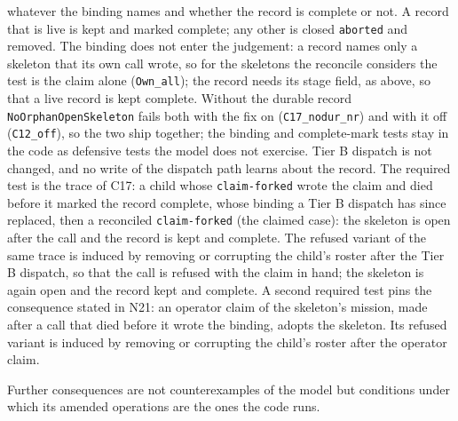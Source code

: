 \documentclass[a4paper,10pt,fleqn]{article}
\newcommand{\field}[1]{\texttt{#1}}
\begin{document}
\begin{itemize}
    whatever the binding names and whether the record is complete or not. A
    record that is live is kept and marked complete; any other is closed
    \field{aborted} and removed. The binding does not enter the judgement: a
    record names only a skeleton that its own call wrote, so for the
    skeletons the reconcile considers the test is the claim alone
    (\texttt{Own\_all}); the record needs its stage field, as above, so that a
    live record is kept complete. Without the durable record \field{NoOrphanOpenSkeleton} fails both with the
    fix on (\texttt{C17\_nodur\_nr}) and with it off (\texttt{C12\_off}), so the two ship together; the binding and complete-mark tests stay in the code
    as defensive tests the model does not exercise. Tier B dispatch is not changed, and no write of the dispatch
    path learns about the record. The required test is the trace of C17: a
    child whose \field{claim-forked} wrote the claim and died before it marked
    the record complete, whose binding a Tier B dispatch has since replaced,
    then a reconciled \field{claim-forked} (the claimed case): the skeleton is
    open after the call and the record is kept and complete. The refused
    variant of the same trace is induced by removing or corrupting the child's
    roster after the Tier B dispatch, so that the call is refused with the claim in
    hand; the skeleton is again open and the record kept and complete. A second required
    test pins the consequence stated in N21: an operator claim of the
    skeleton's mission, made after a call that died before it wrote the
    binding, adopts the skeleton. Its refused variant is induced by removing or corrupting the child's
    roster after the operator claim.
\end{itemize}

Further consequences are not counterexamples of the model but
conditions under which its amended operations are the ones the code runs.
\end{document}
